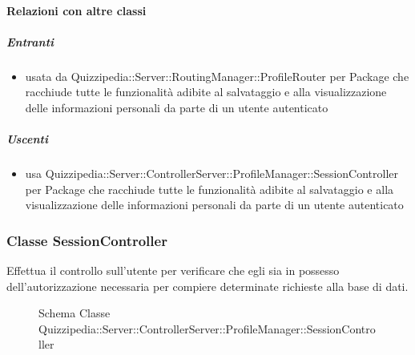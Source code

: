 \paragraph{Relazioni con altre classi}
\subparagraph{Entranti}
\begin{itemize}
\item usata da Quizzipedia::Server::RoutingManager::ProfileRouter per Package che racchiude tutte le funzionalità adibite al salvataggio e alla visualizzazione delle informazioni personali da parte di un utente autenticato
\end{itemize}
\subparagraph{Uscenti}
\begin{itemize}
\item usa Quizzipedia::Server::ControllerServer::ProfileManager::SessionController per Package che racchiude tutte le funzionalità adibite al salvataggio e alla visualizzazione delle informazioni personali da parte di un utente autenticato
\end{itemize}
\subsubsection{Classe SessionController}
Effettua il controllo sull'utente per verificare che egli sia in possesso dell'autorizzazione necessaria per compiere determinate richieste alla base di dati.
\begin{figure}[H]
\centering
\noindent{}
\caption[Schema Classe SessionController]{Schema Classe Quizzipedia::Server::ControllerServer::ProfileManager::SessionController}
\end{figure}
